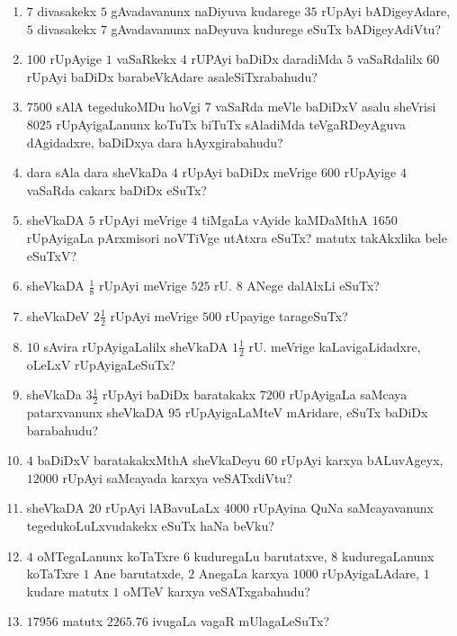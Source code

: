 \begin{enumerate}
\item $7$ divasakekx $5$ gAvadavanunx naDiyuva kudarege $35$ rUpAyi
bADigeyAdare, $5$ divasakekx $7$ gAvadavanunx naDeyuva kudurege eSuTx
bADigeyAdiVtu? 

\item $100$ rUpAyige $1$ vaSaRkekx $4$ rUPAyi baDiDx daradiMda $5$
vaSaRdalilx $60$ rUpAyi baDiDx barabeVkAdare asaleSiTxrabahudu?

\item $7500$ sAlA tegedukoMDu hoVgi 7 vaSaRda meVle baDiDxV asalu
sheVrisi $8025$ rUpAyigaLanunx koTuTx biTuTx sAladiMda teVgaRDeyAguva
dAgidadxre, baDiDxya dara hAyxgirabahudu?

\item dara sAla dara sheVkaDa $4$ rUpAyi baDiDx meVrige $600$ rUpAyige
$4$ vaSaRda cakarx baDiDx eSuTx?

\item sheVkaDA $5$ rUpAyi meVrige $4$ tiMgaLa vAyide kaMDaMthA $1650$
rUpAyigaLa pArxmisori noVTiVge utAtxra eSuTx? matutx takAkxlika bele
eSuTxV?

\item sheVkaDA $\frac{1}{8}$ rUpAyi meVrige $525$ rU. $8$ ANege
dalAlxLi eSuTx?

\item sheVkaDeV $2\frac{1}{2}$ rUpAyi meVrige $500$ rUpayige tarageSuTx?

\item $10$ sAvira rUpAyigaLalilx sheVkaDA $1 \frac{1}{2}$ rU. meVrige
kaLavigaLidadxre, oLeLxV rUpAyigaLeSuTx?

\item sheVkaDa $3\frac{1}{2}$ rUpAyi baDiDx baratakakx $7200$ rUpAyigaLa
saMcaya patarxvanunx sheVkaDA $95$ rUpAyigaLaMteV mAridare, eSuTx
baDiDx barabahudu?

\item $4$ baDiDxV baratakakxMthA sheVkaDeyu $60$ rUpAyi karxya
bALuvAgeyx, $12000$ rUpAyi saMcayada karxya veSATxdiVtu?

\item sheVkaDA $20$ rUpAyi lABavuLaLx $4000$ rUpAyina QuNa
saMcayavanunx tegedukoLuLxvudakekx eSuTx haNa beVku?

\item $4$ oMTegaLanunx koTaTxre $6$ kuduregaLu barutatxve, $8$
kuduregaLanunx koTaTxre $1$ Ane barutatxde, $2$ AnegaLa karxya $1000$
rUpAyigaLAdare, $1$ kudare matutx $1$ oMTeV karxya veSATxgabahudu?

\item $17956$ matutx $2265.76$ ivugaLa vagaR mUlagaLeSuTx?


\end{enumerate}
